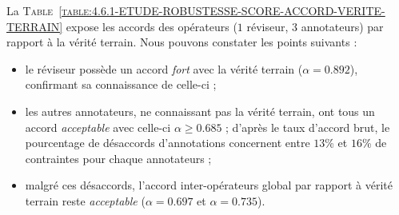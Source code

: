 			La \textsc{Table~\ref{table:4.6.1-ETUDE-ROBUSTESSE-SCORE-ACCORD-VERITE-TERRAIN}} expose les accords des opérateurs ($1$ réviseur, $3$ annotateurs) par rapport à la vérité terrain.
			Nous pouvons constater les points suivants :
			\begin{itemize}
				\item le réviseur possède un accord \textit{fort} avec la vérité terrain ($\alpha = 0.892$), confirmant sa connaissance de celle-ci ;
				\item les autres annotateurs, ne connaissant pas la vérité terrain, ont tous un accord \textit{acceptable} avec celle-ci $\alpha \geq 0.685$ ; d'après le taux d'accord brut, le pourcentage de désaccords d'annotations concernent entre $13$\% et $16$\% de contraintes pour chaque annotateurs ;
				\item malgré ces désaccords, l'accord inter-opérateurs global par rapport à vérité terrain reste \textit{acceptable} ($\alpha = 0.697$ et $\alpha = 0.735$).
			\end{itemize}
			
